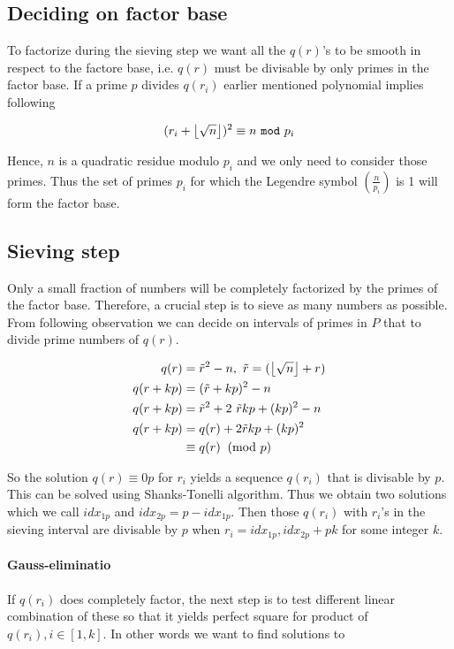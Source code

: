 \subsection{Deciding on factor base}
To factorize during the sieving step we want all the $q(r)$'s to be smooth in respect
to the factore base, i.e. $q(r)$ must be divisable by only primes in the factor base.
If a prime $p$ divides $q(r_i)$ earlier mentioned polynomial implies following

\begin{equation}
(r_i + \myfloor{\sqrt{n}})^2 \equiv n \ \texttt{mod} \ p_i
\end{equation}

Hence, $n$ is a quadratic residue modulo $p_i$ and we only need to consider those primes. Thus the set of primes $p_i$ for which the Legendre symbol $(\frac{n}{p_i})$ is 1 will form the factor base\cite{Pomerance1985}.


\subsection{Sieving step}
Only a small fraction of numbers will be completely factorized by the primes of
the factor base. Therefore, a crucial step is to sieve as many numbers as possible.
From following observation we can decide on intervals of primes in $P$ that
to divide prime numbers of $q(r)$.

\begin{align}
q(r) &= \tilde{r}^2 - n, \ \tilde{r} = (\myfloor{\sqrt{n}} + r) \\
q(r+kp) &= (\tilde{r}+kp)^2-n \\
q(r+kp) &= \tilde{r}^2 + 2 \ \tilde{r}kp + (kp)^2 - n \\
q(r+kp) &= q(r) + 2\tilde{r}kp + (kp)^2 \\
		&\equiv q(r) \imod{p}
\end{align}

So the solution $q(r) \equiv 0 {p}$ for $r_i$ yields a sequence $q(r_i)$ 
that is divisable by $p$. This can be solved using Shanks-Tonelli
algorithm\cite{Pomerance1985}. Thus we obtain two solutions which we call $idx_{1p}$
and $idx_{2p} = p - idx_{1p}$. Then those $q(r_i)$ with $r_i$'s
in the sieving interval are divisable by $p$ when $r_i = idx_{1p}, idx_{2p}+pk$
for some integer $k$.

\paragraph{Gauss-eliminatio}
If $q(r_i)$ does completely factor, the next step is to
test different linear combination of these so that it yields perfect square for 
product of $q(r_i), i \in [1,k]$. In other words we want to find solutions to

